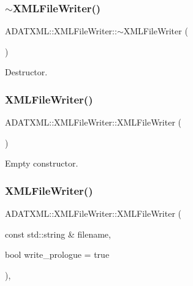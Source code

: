 \subsubsection{\texorpdfstring{$\sim$XMLFileWriter()}{~XMLFileWriter()}\hspace{0.1cm}{\footnotesize\ttfamily [2/3]}}
{\footnotesize\ttfamily A\+D\+A\+T\+X\+M\+L\+::\+X\+M\+L\+File\+Writer\+::$\sim$\+X\+M\+L\+File\+Writer (\begin{DoxyParamCaption}{ }\end{DoxyParamCaption})}



Destructor. 

\mbox{\label{classADATXML_1_1XMLFileWriter_a40db177b66a4598583a3a08e19c1e927}} 
\subsubsection{\texorpdfstring{XMLFileWriter()}{XMLFileWriter()}\hspace{0.1cm}{\footnotesize\ttfamily [5/6]}}
{\footnotesize\ttfamily A\+D\+A\+T\+X\+M\+L\+::\+X\+M\+L\+File\+Writer\+::\+X\+M\+L\+File\+Writer (\begin{DoxyParamCaption}{ }\end{DoxyParamCaption})}



Empty constructor. 

\mbox{\label{classADATXML_1_1XMLFileWriter_a83cf749ff969a30d3de1895f271b238a}} 
\subsubsection{\texorpdfstring{XMLFileWriter()}{XMLFileWriter()}\hspace{0.1cm}{\footnotesize\ttfamily [6/6]}}
{\footnotesize\ttfamily A\+D\+A\+T\+X\+M\+L\+::\+X\+M\+L\+File\+Writer\+::\+X\+M\+L\+File\+Writer (\begin{DoxyParamCaption}\item[{const std\+::string \&}]{filename,  }\item[{bool}]{write\+\_\+prologue = {\ttfamily true} }\end{DoxyParamCaption})\hspace{0.3cm}{\ttfamily [inline]}, {\ttfamily [explicit]}}



